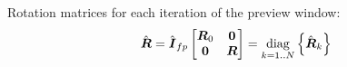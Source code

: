 \documentclass[12pt,a4paper]{article}
\begin{document}
Rotation matrices for each iteration of the preview window:
\begin{equation*}
    \hat{\mbox{\boldmath $R$}} = 
    \hat{\mbox{\boldmath $I$}}_{fp} 
    \begin{bmatrix}
        \mbox{\boldmath $R$}_0     &   \mbox{\boldmath $0$}\\
        \mbox{\boldmath $0$}       &   \mbox{\boldmath $R$}\\
    \end{bmatrix}
    = \underset{k = 1..N}{\operatorname{diag}}\left\{\hat{\mbox{\boldmath $R$}}_k\right\}
\end{equation*}











\end{document}
